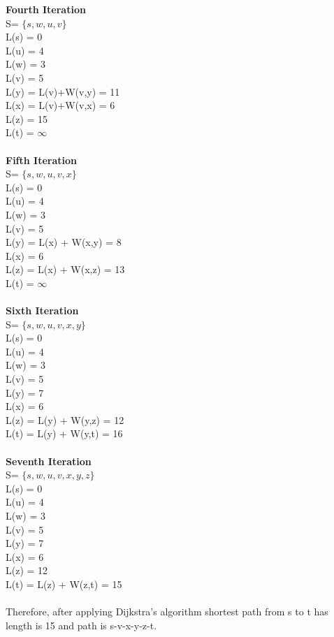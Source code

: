 \documentclass[11pt]{article}
\begin{document}
\textbf{Fourth Iteration}\\
S= $\{s,w,u,v \}$ \\
L(s) = 0 \\
L(u) = 4\\
L(w) = 3\\
L(v) = 5\\
L(y) = L(v)+W(v,y) = 11\\
L(x) = L(v)+W(v,x) = 6\\
L(z) = 15\\
L(t) = $\infty$\\ \\
\textbf{Fifth Iteration} \\
S= $\{s,w,u,v,x \}$ \\
L(s) = 0 \\
L(u) = 4\\
L(w) = 3\\
L(v) = 5\\
L(y) = L(x) + W(x,y) = 8\\
L(x) = 6\\
L(z) = L(x) + W(x,z) = 13\\
L(t) = $\infty$\\ \\
\textbf{Sixth Iteration} \\
S= $\{ s,w,u,v,x,y \}$ \\
L(s) = 0 \\
L(u) = 4\\
L(w) = 3\\
L(v) = 5\\
L(y) = 7\\
L(x) = 6\\
L(z) = L(y) + W(y,z) = 12\\
L(t) = L(y) + W(y,t) = 16\\ \\
\textbf{Seventh Iteration} \\
S= $\{ s,w,u,v,x,y,z \}$ \\
L(s) = 0 \\
L(u) = 4\\
L(w) = 3\\
L(v) = 5\\
L(y) = 7\\
L(x) = 6\\
L(z) = 12\\
L(t) = L(z) + W(z,t) = 15\\ \\
Therefore, after applying Dijkstra's algorithm shortest path from s to t has length is 15 and path is s-v-x-y-z-t.
\end{document}
